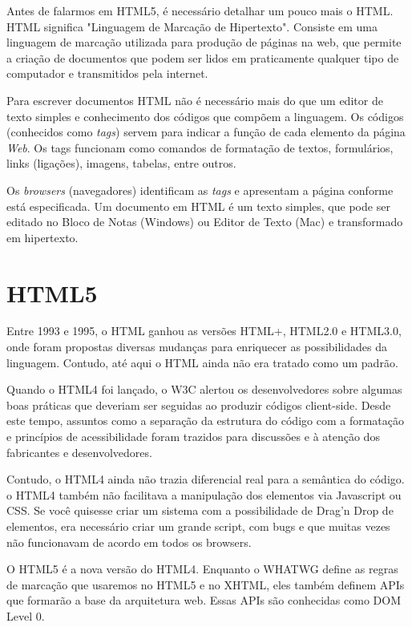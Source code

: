 Antes de falarmos em HTML5, é necessário detalhar um pouco mais o HTML. HTML significa "Linguagem de Marcação de Hipertexto". Consiste em uma linguagem de marcação utilizada para produção de páginas na web, que permite a criação de documentos que podem ser lidos em praticamente qualquer tipo de computador e transmitidos pela internet.

Para escrever documentos HTML não é necessário mais do que um editor de texto simples e conhecimento dos códigos que compõem a linguagem. Os códigos (conhecidos como \textit{tags}) servem para indicar a função de cada elemento da página \textit{Web}. Os tags funcionam como comandos de formatação de textos, formulários, links (ligações), imagens, tabelas, entre outros.

Os \textit{browsers} (navegadores) identificam as \textit{tags} e apresentam a página conforme está especificada. Um documento em HTML é um texto simples, que pode ser editado no Bloco de Notas (Windows) ou Editor de Texto (Mac) e transformado em hipertexto.

\section{HTML5}

Entre 1993 e 1995, o HTML ganhou as versões HTML+, HTML2.0 e HTML3.0, onde foram propostas diversas mudanças para enriquecer as possibilidades da linguagem. Contudo, até aqui o HTML ainda não era tratado como um padrão.

Quando o HTML4 foi lançado, o W3C alertou os desenvolvedores sobre algumas boas práticas que deveriam ser seguidas ao produzir códigos client-side. Desde este tempo, assuntos como a separação da estrutura do código com a formatação e princípios de acessibilidade foram trazidos para discussões e à atenção dos fabricantes e desenvolvedores.

Contudo, o HTML4 ainda não trazia diferencial real para a semântica do código. o HTML4 também não facilitava a manipulação dos elementos via Javascript ou CSS. Se você quisesse criar um
sistema com a possibilidade de Drag’n Drop de elementos, era necessário criar um grande script,
com bugs e que muitas vezes não funcionavam de acordo em todos os browsers.

O HTML5 é a nova versão do HTML4. Enquanto o WHATWG define as regras de marcação que usaremos no HTML5 e no XHTML, eles também definem APIs que formarão a base da arquitetura web. Essas APIs são conhecidas como DOM Level 0.

